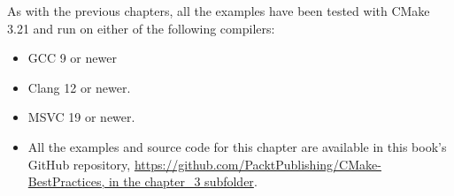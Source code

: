 
As with the previous chapters, all the examples have been tested with CMake 3.21 and run on either of the following compilers:

\begin{itemize}
\item 
GCC 9 or newer

\item 
Clang 12 or newer.

\item 
MSVC 19 or newer.

\item 
All the examples and source code for this chapter are available in this book's GitHub repository, \url{https://github.com/PacktPublishing/CMake-BestPractices, in the chapter_3 subfolder}.
\end{itemize}